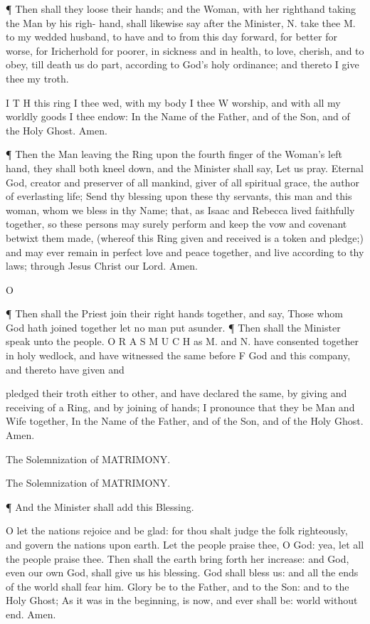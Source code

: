 ¶ Then shall they loose their hands; and the Woman, with her righthand taking the Man by his righ- hand, shall likewise say after the Minister, N. take thee M. to my wedded husband, to have and to from this day forward, for better for worse, for Iricherhold for poorer, in sickness and in health, to love, cherish, and to obey, till death us do part, according to God’s holy ordinance; and thereto I give thee my troth.

I T H this ring I thee wed, with my body I thee W worship, and with all my worldly goods I thee endow: In the Name of the Father, and of the Son, and of the Holy Ghost. Amen.

¶ Then the Man leaving the Ring upon the fourth finger of the Woman’s left hand, they shall both kneel down, and the Minister shall say, Let us pray. Eternal God, creator and preserver of all mankind, giver of all spiritual grace, the author of everlasting life; Send thy blessing upon these thy servants, this man and this woman, whom we bless in thy Name; that, as Isaac and Rebecca lived faithfully together, so these persons may surely perform and keep the vow and covenant betwixt them made, (whereof this Ring given and received is a token and pledge;) and may ever remain in perfect love and peace together, and live according to thy laws; through Jesus Christ our Lord. Amen.

O

¶ Then shall the Priest join their right hands together, and say, Those whom God hath joined together let no man put asunder. ¶ Then shall the Minister speak unto the people. O R A S M U C H as M. and N. have consented together in holy wedlock, and have witnessed the same before F God and this company, and thereto have given and

pledged their troth either to other, and have declared the same, by giving and receiving of a Ring, and by joining of hands; I pronounce that they be Man and Wife together, In the Name of the Father, and of the Son, and of the Holy Ghost. Amen.

The Solemnization of MATRIMONY.

The Solemnization of MATRIMONY.

¶ And the Minister shall add this Blessing.

O let the nations rejoice and be glad: for thou shalt judge the folk righteously, and govern the nations upon earth. Let the people praise thee, O God: yea, let all the people praise thee. Then shall the earth bring forth her increase: and God, even our own God, shall give us his blessing. God shall bless us: and all the ends of the world shall fear him. Glory be to the Father, and to the Son: and to the Holy Ghost; As it was in the beginning, is now, and ever shall be: world without end. Amen.

